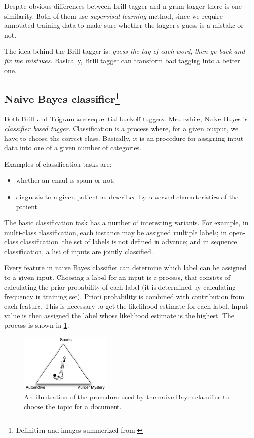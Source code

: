 \documentclass[10pt, conference, compsocconf]{IEEEtran}
\begin{document}
Despite obvious differences between Brill tagger and n-gram tagger there is one similarity. Both of them use \textit{supervised learning} method, since we require annotated training data to make sure whether the tagger's guess is a mistake or not.

The idea behind the Brill tagger is: \textit{guess the tag of each word, then go back and fix the mistakes}. Basically, Brill tagger can transform bad tagging into a better one. 

\subsection[Naive Bayes classifier]{Naive Bayes classifier\footnote{Definition and images summerized from \cite{NLTKBOOK}}}
Both Brill and Trigram are sequential backoff taggers. Meanwhile, Naive Bayes is \textit{classifier based tagger}.
Classification is a process where, for a given output, we have to choose the correct class. Basically, it is an  procedure for assigning  input data into one of a given number of categories.

Examples of classification tasks are:
\begin{itemize}
\item whether an email is spam or not.
\item diagnosis to a given patient as described by observed characteristics of the patient
\end{itemize}
The basic classification task has a number of interesting variants. For example, in multi-class classification, each instance may be assigned multiple labels; in open-class classification, the set of labels is not defined in advance; and in sequence classification, a list of inputs are jointly classified.

Every feature in naive Bayes classifier can determine which label can be assigned to a given input. Choosing a label for an input is a process, that consists of calculating the prior probability of each label (it is determined by calculating frequency in training set). Priori probability is combined with contribution from each feature. This is necessary to get the likelihood estimate for each label. Input value is then assigned the label whose likelihood estimate is the highest. The process is shown in \ref{fig:naive-bayes-triangle}.

\begin{figure}[htb]
\begin{center}
\includegraphics[width=0.4\textwidth]{naive-bayes-triangle.png} 
\end{center}
\caption{An illustration of the procedure used by the naive Bayes classifier to choose the topic for a document.}
\label{fig:naive-bayes-triangle}
\end{figure}
\end{document}
